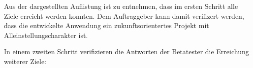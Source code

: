 Aus der dargestellten Auflistung ist zu entnehmen, dass im ersten Schritt alle Ziele erreicht werden konnten.
Dem Auftraggeber kann damit verifizert werden, dass die entwickelte Anwendung ein zukunftsorientertes Projekt mit
Alleinstellungscharakter ist.

In einem zweiten Schritt verifizieren die Antworten der Betatester die Erreichung weiterer Ziele:




